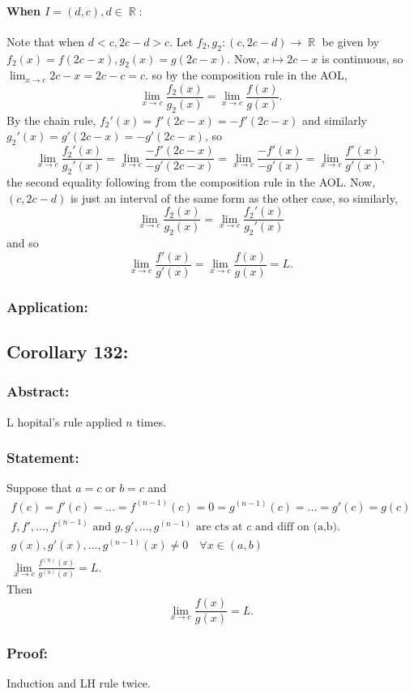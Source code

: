 \documentclass{article}
\DeclareMathOperator\R{\mathbb{R}}
\begin{document}
\paragraph{When $I=(d,c), d \in \R:$}
Note that when $d<c, 2c-d>c$.
Let $f_2,g_2:(c,2c-d) \to \R$ be given by $f_2(x) = f(2c-x), g_2(x) = g(2c-x)$.
Now, $x \mapsto 2c-x$ is continuous, so $\lim_{x \to c}2c-x = 2c-c = c$.
so by the composition rule in the AOL, \[
\lim_{x \to c}\frac{f_2(x)}{g_2(x)} = \lim_{x \to c}\frac{f(x)}{g(x)}.
\]
By the chain rule, $f_2'(x) = f'(2c-x) = -f'(2c-x)$ and similarly
$g_2'(x) = g'(2c-x) = -g'(2c-x)$, so \[
\lim_{x \to c}\frac{f_2'(x)}{g_2'(x)} = \lim_{x \to c}\frac{-f'(2c-x)}{-g'(2c-x)}
= \lim_{x \to c}\frac{-f'(x)}{-g'(x)} = \lim_{x \to c}\frac{f'(x)}{g'(x)},
\]
the second equality following from the composition rule in the AOL.
Now, $(c,2c-d)$ is just an interval of the same form as the other case,
so similarly, \[
\lim_{x \to c}\frac{f_2(x)}{g_2(x)} = \lim_{x \to c}\frac{f_2'(x)}{g_2'(x)}
\]
and so
$$\lim_{x \to c}\frac{f'(x)}{g'(x)} = \lim_{x \to c}\frac{f(x)}{g(x)} = L.$$
\subsubsection*{Application:}

\subsection{Corollary 132:}
\subsubsection*{Abstract:}
L hopital's rule applied $n$ times.
\subsubsection*{Statement:}
Suppose that $a=c$ or $b = c$ and
\begin{gather}
f(c) = f'(c) = ... = f^{(n-1)}(c) = 0 = g^{(n-1)}(c) = ... = g'(c) = g(c) \\
f,f',...,f^{(n-1)} \text{ and $g,g',...,g^{(n-1)}$ are cts at $c$ and diff on (a,b).} \\
g(x),g'(x),...,g^{(n-1)}(x) \neq 0 \quad \forall x \in (a,b) \\
\lim_{x \to c}\frac{f^{(n)}(x)}{g^{(n)}(x)} = L.
\end{gather}
Then \[
\lim_{x \to c}\frac{f(x)}{g(x)} = L.
\]
\subsubsection*{Proof:}
Induction and LH rule twice.
\end{document}
